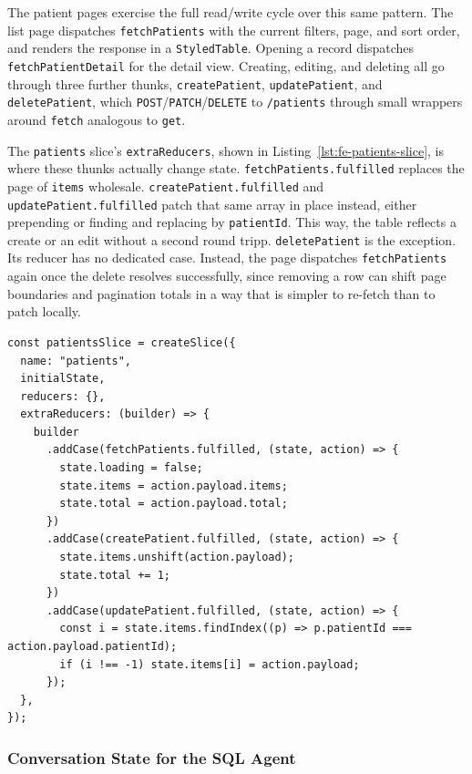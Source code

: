 The patient pages exercise the full read/write cycle over this same pattern. The list page dispatches \texttt{fetchPatients} with the current filters, page, and sort order, and renders the response in a \texttt{StyledTable}. Opening a record dispatches \texttt{fetchPatientDetail} for the detail view. Creating, editing, and deleting all go through three further thunks, \texttt{createPatient}, \texttt{updatePatient}, and \texttt{deletePatient}, which \texttt{POST}/\texttt{PATCH}/\texttt{DELETE} to \texttt{/patients} through small wrappers around \texttt{fetch} analogous to \texttt{get}.

The \texttt{patients} slice's \texttt{extraReducers}, shown in Listing~\ref{lst:fe-patients-slice}, is where these thunks actually change  state. \texttt{fetchPatients.fulfilled} replaces the page of \texttt{items} wholesale. \texttt{createPatient.fulfilled} and \texttt{updatePatient.fulfilled} patch that same array in place instead, either prepending or finding and replacing by \texttt{patientId}. This way, the table reflects a create or an edit without a second round tripp. \texttt{deletePatient} is the exception. Its reducer has no dedicated case. Instead, the page dispatches \texttt{fetchPatients} again once the delete resolves successfully, since removing a row can shift page boundaries and pagination totals in a way that is simpler to re-fetch than to patch locally.

\begin{lstlisting}[style=tsxstyle, caption={Patients slice: reducer state changes driven by the CRUD thunks}, label={lst:fe-patients-slice}]
const patientsSlice = createSlice({
  name: "patients",
  initialState,
  reducers: {},
  extraReducers: (builder) => {
    builder
      .addCase(fetchPatients.fulfilled, (state, action) => {
        state.loading = false;
        state.items = action.payload.items;
        state.total = action.payload.total;
      })
      .addCase(createPatient.fulfilled, (state, action) => {
        state.items.unshift(action.payload);
        state.total += 1;
      })
      .addCase(updatePatient.fulfilled, (state, action) => {
        const i = state.items.findIndex((p) => p.patientId === action.payload.patientId);
        if (i !== -1) state.items[i] = action.payload;
      });
  },
});
\end{lstlisting}

\subsubsection*{Conversation State for the SQL Agent}

